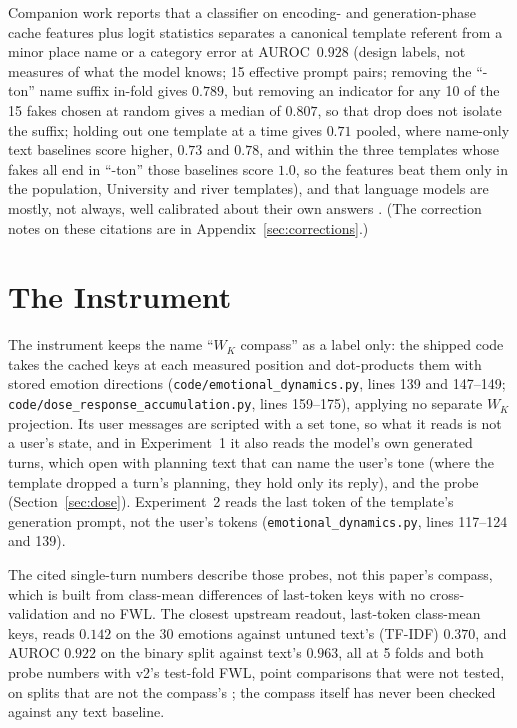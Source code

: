 \documentclass[11pt,a4paper]{article}
\begin{document}
Companion work \citep{lyra2026decision} reports that
a classifier on encoding- and generation-phase cache features plus logit
statistics separates a canonical template referent from a minor place
name or a category error at AUROC~$0.928$ (design labels, not measures
of what the model knows; 15 effective prompt pairs; removing the
``-ton'' name suffix in-fold gives $0.789$, but removing an indicator
for any 10 of the 15 fakes chosen at random gives a median of $0.807$,
so that drop does not isolate the suffix; holding out one template at a
time gives $0.71$ pooled, where name-only text baselines score higher,
$0.73$ and $0.78$, and within the three templates whose fakes all end in
``-ton'' those baselines score $1.0$, so the features beat them only in the population, University and river templates),
and that language models are mostly, not always, well calibrated about
their own answers \citep{kadavath2022language}. (The correction notes on
these citations are in Appendix~\ref{sec:corrections}.)

\section{The Instrument}
\label{sec:instrument}

{\sloppy The instrument keeps the name ``$W_K$ compass'' as a label only: the
shipped code takes the cached keys at each measured position and
dot-products them with stored emotion directions
(\texttt{code/\allowbreak emotional\_\allowbreak dynamics.py}, lines 139 and 147--149;
\texttt{code/\allowbreak dose\_\allowbreak response\_\allowbreak accumulation.py}, lines 159--175), applying
no separate $W_K$ projection. Its user messages are scripted with a set
tone, so what it reads is not a user's state, and in Experiment~1 it
also reads the model's own generated turns, which open with planning
text that can name the user's tone (where the template dropped a turn's
planning, they hold only its reply), and the probe
(Section~\ref{sec:dose}). Experiment~2 reads the last token of the
template's generation prompt, not the user's tokens
(\texttt{emotional\_dynamics.py}, lines 117--124 and 139).\par}

The cited single-turn numbers describe those probes, not this paper's
compass, which is built from class-mean differences of last-token keys
with no cross-validation and no FWL. The closest upstream readout,
last-token class-mean keys, reads $0.142$ on the 30 emotions against
untuned text's (TF-IDF) $0.370$, and AUROC $0.922$ on the binary split
against text's $0.963$, all at 5 folds and both probe numbers with v2's
test-fold FWL, point comparisons that were not tested, on splits that
are not the compass's \citep{lyra2026usermodel}; the compass itself has
never been checked against any text baseline.
\end{document}

